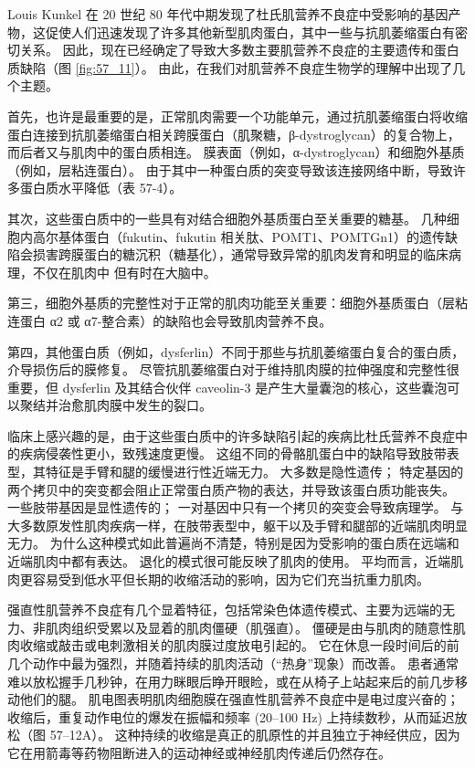 Louis Kunkel 在 20 世纪 80 年代中期发现了杜氏肌营养不良症中受影响的基因产物，这促使人们迅速发现了许多其他新型肌肉蛋白，其中一些与抗肌萎缩蛋白有密切关系。 因此，现在已经确定了导致大多数主要肌营养不良症的主要遗传和蛋白质缺陷（图 \ref{fig:57_11}）。 由此，在我们对肌营养不良症生物学的理解中出现了几个主题。

首先，也许是最重要的是，正常肌肉需要一个功能单元，通过抗肌萎缩蛋白将收缩蛋白连接到抗肌萎缩蛋白相关跨膜蛋白（肌聚糖，β-dystroglycan）的复合物上，而后者又与肌肉中的蛋白质相连。 膜表面（例如，α-dystroglycan）和细胞外基质（例如，层粘连蛋白）。 由于其中一种蛋白质的突变导致该连接网络中断，导致许多蛋白质水平降低（表 57-4）。

其次，这些蛋白质中的一些具有对结合细胞外基质蛋白至关重要的糖基。 几种细胞内高尔基体蛋白（fukutin、fukutin 相关肽、POMT1、POMTGn1）的遗传缺陷会损害跨膜蛋白的糖沉积（糖基化），通常导致异常的肌肉发育和明显的临床病理，不仅在肌肉中 但有时在大脑中。

第三，细胞外基质的完整性对于正常的肌肉功能至关重要：细胞外基质蛋白（层粘连蛋白 α2 或 α7-整合素）的缺陷也会导致肌肉营养不良。

第四，其他蛋白质（例如，dysferlin）不同于那些与抗肌萎缩蛋白复合的蛋白质，介导损伤后的膜修复。 尽管抗肌萎缩蛋白对于维持肌肉膜的拉伸强度和完整性很重要，但 dysferlin 及其结合伙伴 caveolin-3 是产生大量囊泡的核心，这些囊泡可以聚结并治愈肌肉膜中发生的裂口。

临床上感兴趣的是，由于这些蛋白质中的许多缺陷引起的疾病比杜氏营养不良症中的疾病侵袭性更小，致残速度更慢。 这组不同的骨骼肌蛋白中的缺陷导致肢带表型，其特征是手臂和腿的缓慢进行性近端无力。 大多数是隐性遗传； 特定基因的两个拷贝中的突变都会阻止正常蛋白质产物的表达，并导致该蛋白质功能丧失。 一些肢带基因是显性遗传的； 一对基因中只有一个拷贝的突变会导致病理学。 与大多数原发性肌肉疾病一样，在肢带表型中，躯干以及手臂和腿部的近端肌肉明显无力。 为什么这种模式如此普遍尚不清楚，特别是因为受影响的蛋白质在远端和近端肌肉中都有表达。 退化的模式很可能反映了肌肉的使用。 平均而言，近端肌肉更容易受到低水平但长期的收缩活动的影响，因为它们充当抗重力肌肉。

强直性肌营养不良症有几个显着特征，包括常染色体遗传模式、主要为远端的无力、非肌肉组织受累以及显着的肌肉僵硬（肌强直）。 僵硬是由与肌肉的随意性肌肉收缩或敲击或电刺激相关的肌肉膜过度放电引起的。 它在休息一段时间后的前几个动作中最为强烈，并随着持续的肌肉活动（“热身”现象）而改善。 患者通常难以放松握手几秒钟，在用力眯眼后睁开眼睑，或在从椅子上站起来后的前几步移动他们的腿。 肌电图表明肌肉细胞膜在强直性肌营养不良症中是电过度兴奋的； 收缩后，重复动作电位的爆发在振幅和频率 (20–100 Hz) 上持续数秒，从而延迟放松（图 57–12A）。 这种持续的收缩是真正的肌原性的并且独立于神经供应，因为它在用箭毒等药物阻断进入的运动神经或神经肌肉传递后仍然存在。

